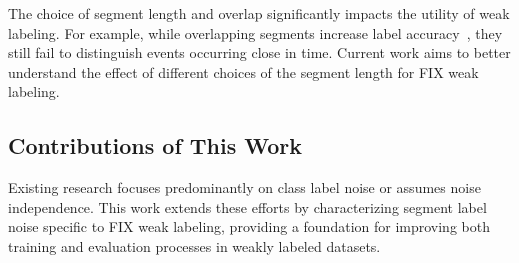 The choice of segment length and overlap significantly impacts the utility of weak labeling. For example, while overlapping segments increase label accuracy~\citep{Martin-Morato2023a}, they still fail to distinguish events occurring close in time. Current work aims to better understand the effect of different choices of the segment length for FIX weak labeling.


\subsection{Contributions of This Work}

Existing research focuses predominantly on class label noise or assumes noise independence. This work extends these efforts by characterizing segment label noise specific to FIX weak labeling, providing a foundation for improving both training and evaluation processes in weakly labeled datasets.
